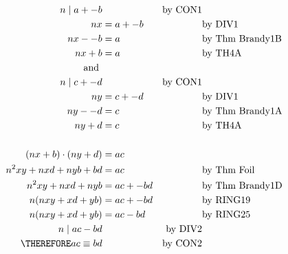 
\begin{align*}
n \mid a + -b && \text{by CON1} \\
nx &= a + -b && \text{by DIV1} \\
nx - -b &= a && \text{by Thm Brandy1B} \\
nx + b &= a && \text{by TH4A} \\
\text{ and } \\
n \mid c + -d && \text{by CON1} \\
ny &= c + -d && \text{by DIV1} \\
ny - -d &= c && \text{by Thm Brandy1A} \\
ny + d &= c && \text{by TH4A} \\
\\
(nx + b) \cdot (ny + d) &= ac\\
n^2xy + nxd + nyb + bd &= ac && \text{by Thm Foil} \\
n^2xy + nxd + nyb &= ac + -bd && \text{by Thm Brandy1D} \\
n(nxy + xd + yb) &= ac + -bd && \text{by RING19} \\
n(nxy + xd + yb) &= ac - bd && \text{by RING25} \\
n \mid ac - bd && \text{by DIV2} \\
\THEREFORE ac \equiv bd && \text{by CON2} \\
\end{align*}

